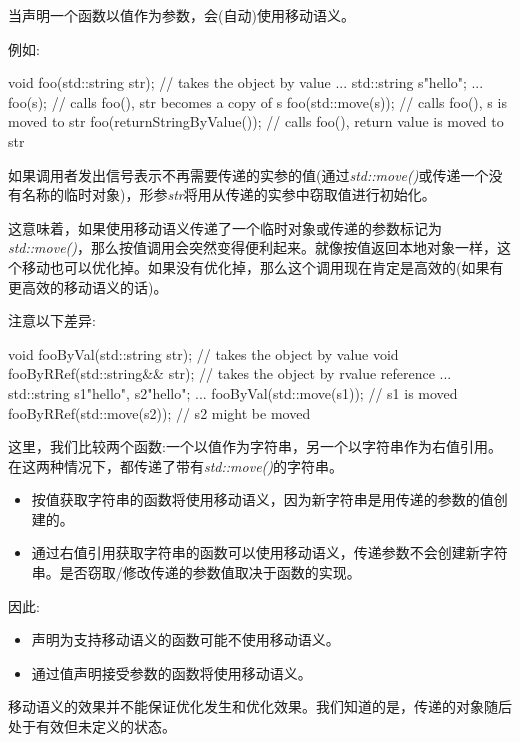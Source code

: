 当声明一个函数以值作为参数，会(自动)使用移动语义。

例如:

\begin{cppcode}
void foo(std::string str); // takes the object by value
...
std::string s{"hello"};
...
foo(s); // calls foo(), str becomes a copy of s
foo(std::move(s)); // calls foo(), s is moved to str
foo(returnStringByValue()); // calls foo(), return value is moved to str
\end{cppcode}

如果调用者发出信号表示不再需要传递的实参的值(通过\textit{std::move()}或传递一个没有名称的临时对象)，形参\textit{str}将用从传递的实参中窃取值进行初始化。

这意味着，如果使用移动语义传递了一个临时对象或传递的参数标记为\textit{std::move()}，那么按值调用会突然变得便利起来。就像按值返回本地对象一样，这个移动也可以优化掉。如果没有优化掉，那么这个调用现在肯定是高效的(如果有更高效的移动语义的话)。

注意以下差异:

\begin{cppcode}
void fooByVal(std::string str); // takes the object by value
void fooByRRef(std::string&& str); // takes the object by rvalue reference
...
std::string s1{"hello"}, s2{"hello"};
...
fooByVal(std::move(s1)); // s1 is moved
fooByRRef(std::move(s2)); // s2 might be moved
\end{cppcode}

这里，我们比较两个函数:一个以值作为字符串，另一个以字符串作为右值引用。在这两种情况下，都传递了带有\textit{std::move()}的字符串。

\begin{itemize}
	\item 按值获取字符串的函数将使用移动语义，因为新字符串是用传递的参数的值创建的。
	\item 通过右值引用获取字符串的函数可以使用移动语义，传递参数不会创建新字符串。是否窃取/修改传递的参数值取决于函数的实现。
\end{itemize}

因此:

\begin{itemize}
	\item 声明为支持移动语义的函数可能不使用移动语义。
	\item 通过值声明接受参数的函数将使用移动语义。
\end{itemize}

移动语义的效果并不能保证优化发生和优化效果。我们知道的是，传递的对象随后处于有效但未定义的状态。













